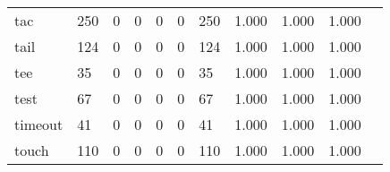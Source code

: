 \begin{longtable}{lp{1.2cm}p{1.2cm}p{1.2cm}p{1.2cm}p{1.2cm}p{1.2cm}p{1.2cm}p{1.2cm}p{1.2cm}p{1.2cm}}
tac       &                                   250 &                                                  0 &                                                  0 &                                                  0 &                                                  0 &                                                250 &                                              1.000 &                                              1.000 &                                              1.000 \\
tail      &                                   124 &                                                  0 &                                                  0 &                                                  0 &                                                  0 &                                                124 &                                              1.000 &                                              1.000 &                                              1.000 \\
tee       &                                    35 &                                                  0 &                                                  0 &                                                  0 &                                                  0 &                                                 35 &                                              1.000 &                                              1.000 &                                              1.000 \\
test      &                                    67 &                                                  0 &                                                  0 &                                                  0 &                                                  0 &                                                 67 &                                              1.000 &                                              1.000 &                                              1.000 \\
timeout   &                                    41 &                                                  0 &                                                  0 &                                                  0 &                                                  0 &                                                 41 &                                              1.000 &                                              1.000 &                                              1.000 \\
touch     &                                   110 &                                                  0 &                                                  0 &                                                  0 &                                                  0 &                                                110 &                                              1.000 &                                              1.000 &                                              1.000 \\

\end{longtable}
